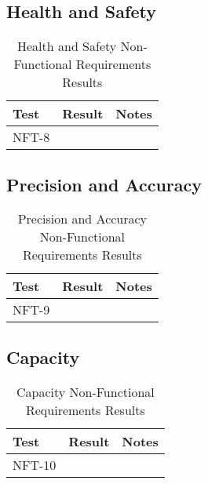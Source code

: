 \documentclass[12pt, titlepage]{article}
\begin{document}
\subsection{Health and Safety}

\begin{table}[H]
\centering
    \setlength{\leftmargini}{0.4cm}
    \begin{tabular}{| >{\centering\arraybackslash}m{3cm} | 
      >{\centering\arraybackslash}m{4cm} | 
      >{\centering\arraybackslash}m{6cm} |}
    \hline
    \rowcolor[gray]{0.9}
    Test & Result & Notes\\
    \hline
    NFT-8 &  & \\
    \hline
    \end{tabular}
\caption{Health and Safety Non-Functional Requirements Results}
\end{table}

\subsection{Precision and Accuracy}

\begin{table}[H]
\centering
    \setlength{\leftmargini}{0.4cm}
    \begin{tabular}{| >{\centering\arraybackslash}m{3cm} | 
      >{\centering\arraybackslash}m{4cm} | 
      >{\centering\arraybackslash}m{6cm} |}
    \hline
    \rowcolor[gray]{0.9}
    Test & Result & Notes\\
    \hline
    NFT-9 &  & \\
    \hline
    \end{tabular}
\caption{Precision and Accuracy Non-Functional Requirements Results}
\end{table}

\subsection{Capacity}

\begin{table}[H]
\centering
    \setlength{\leftmargini}{0.4cm}
    \begin{tabular}{| >{\centering\arraybackslash}m{3cm} | 
      >{\centering\arraybackslash}m{4cm} | 
      >{\centering\arraybackslash}m{6cm} |}
    \hline
    \rowcolor[gray]{0.9}
    Test & Result & Notes\\
    \hline
    NFT-10 &  & \\
    \hline
    \end{tabular}
\caption{Capacity Non-Functional Requirements Results}
\end{table}
\end{document}
